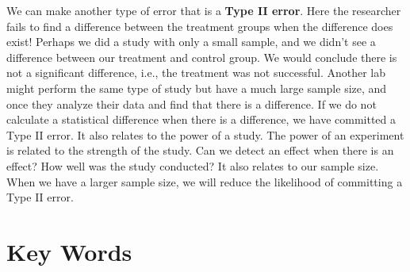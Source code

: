 \documentclass[11pt]{book}\usepackage[]{graphicx}\usepackage[]{color}
\begin{document}
We can make another type of error that is a \textbf{Type II error}.  Here the researcher fails to find a difference between the treatment groups when the difference does exist!  Perhaps we did a study with only a small sample, and we didn't see a difference between our treatment and control group. We would conclude there is not a significant difference, i.e., the treatment was not successful.  Another lab might perform the same type of study but have a much large sample size, and once they analyze their data and find that there is a difference.  If we do not calculate a statistical difference when there is a difference, we have committed a Type II error.  It also relates to the power of a study.  The power of an experiment is related to the strength of the study.  Can we detect an effect when there is an effect?  How well was the study conducted?  It also relates to our sample size.  When we have a larger sample size, we will reduce the likelihood of committing a Type II error.

\section{Key Words}




\twocolumn

\section{}    %
\end{document}
